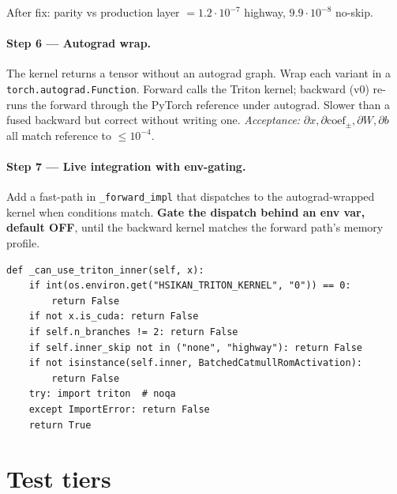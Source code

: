 \documentclass[11pt,a4paper]{article}
\begin{document}
After fix: parity vs production layer $= 1.2\cdot 10^{-7}$ highway, $9.9\cdot 10^{-8}$ no-skip.

\paragraph{Step 6 — Autograd wrap.}
The kernel returns a tensor without an autograd graph. Wrap each variant in a \texttt{torch.autograd.Function}. Forward calls the Triton kernel; backward (v0) re-runs the forward through the PyTorch reference under autograd. Slower than a fused backward but correct without writing one.
\textit{Acceptance:} $\partial x, \partial \mathrm{coef}_{\pm}, \partial W, \partial b$ all match reference to $\le 10^{-4}$.

\paragraph{Step 7 — Live integration with env-gating.}
Add a fast-path in \texttt{\_forward\_impl} that dispatches to the autograd-wrapped kernel when conditions match. \textbf{Gate the dispatch behind an env var, default OFF}, until the backward kernel matches the forward path's memory profile.

\begin{lstlisting}
def _can_use_triton_inner(self, x):
    if int(os.environ.get("HSIKAN_TRITON_KERNEL", "0")) == 0:
        return False
    if not x.is_cuda: return False
    if self.n_branches != 2: return False
    if self.inner_skip not in ("none", "highway"): return False
    if not isinstance(self.inner, BatchedCatmullRomActivation):
        return False
    try: import triton  # noqa
    except ImportError: return False
    return True
\end{lstlisting}

\section{Test tiers}

\begin{center}
\end{center}
\end{document}
